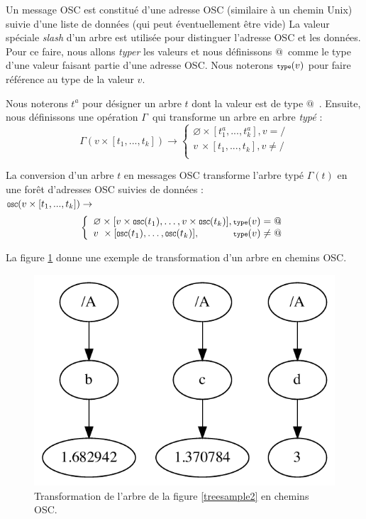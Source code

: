 \documentclass{article}
\makeatletter
\newcommand{\llist}	[1]		{\ensuremath{[#1_1,...,#1_k]}}
\newcommand{\type}		{\ensuremath{{\scriptsize \texttt{type}}}}
\newcommand{\forest}	{\ensuremath{\varnothing}}
\newcommand{\toAddress}	{\ensuremath{\varGamma}}
\newcommand{\toOSCAddress}	{\ensuremath{{\scriptsize \texttt{OSC}}}}
\newcommand{\taddress}	{\ensuremath{\text{@}}}
\newcommand{\etc}		{\ensuremath{\text{…}}}
\makeatother
\begin{document}
Un message OSC est constitué d'une adresse OSC (similaire à un chemin Unix) suivie d'une liste de données (qui peut éventuellement être vide)
La valeur spéciale \emph{slash} d'un arbre est utilisée pour distinguer l'adresse OSC et les données. Pour ce faire, nous allons \emph{typer} les valeurs et nous définissons \taddress\ comme le type d'une valeur faisant partie d'une adresse OSC. Nous noterons $\type(v)$ pour faire référence au type de la valeur $v$.

Nous noterons $t^a$ pour désigner un arbre $t$ dont la valeur est de type \taddress\ .
Ensuite, nous définissons une opération \toAddress\ qui transforme un arbre en arbre \emph{typé} :
\[
    \toAddress (v \times \llist{t}) \to 
\left\{
\begin{array}{l}
	\forest \times \llist{t^a} , v = /\\
	v \ \times \llist{t} , v \neq / \\
\end{array}
\right.
\]

La conversion d'un arbre $t$ en messages OSC transforme l'arbre typé $\toAddress (t)$ en une forêt d'adresses OSC suivies de données :\\

\vspace*{2mm}
\hspace*{5mm} $\toOSCAddress (v \times \llist{t}) \to$
\[
\left\{
\begin{array}{l}
	\forest \times [ v \times \toOSCAddress(t_1),\etc , v \times \toOSCAddress(t_k)] , \type(v) = \taddress\\
	v \ \times [ \toOSCAddress(t_1),\etc , \toOSCAddress(t_k)] , \hspace{12mm} \type(v) \neq \taddress \\
\end{array}
\right.
\]

La figure \ref{pathssample4} donne une exemple de transformation d'un arbre en chemins OSC.
\begin{figure}[htbp]
\begin{center}
\includegraphics[width=0.6\columnwidth]{paths/sample3}
\caption{Transformation de l'arbre de la figure \ref{treesample2} en chemins OSC.}
\label{pathssample4}
\end{center}
\end{figure}
\end{document}
